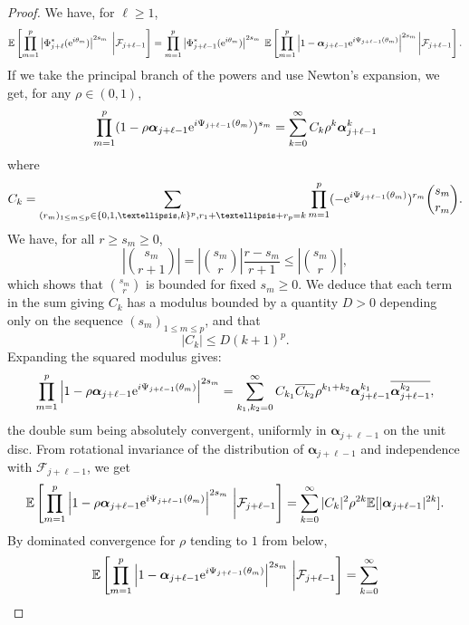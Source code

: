 \documentclass[10pt,a4paper]{amsart}
\begin{document}
\begin{proof}
We have, for 
$\ell \geq 1$, 
$$\mathbb{E} \left[ \prod_{m=1}^p \left|\Phi^*_{j+\ell} (\mathrm{e}^{\textnormal{i} \theta_m})
\right|^{2s_m} \;  \bigg| \mathcal{F}_{j+ \ell - 1} \right]
= \prod_{m=1}^p \left|\Phi^*_{j+\ell-1} (\mathrm{e}^{\textnormal{i} \theta_m})
\right|^{2s_m} \; 
\mathbb{E} \left[ \prod_{m=1}^p \left| 1 - \boldsymbol{\alpha}_{j+\ell-1} \mathrm{e}^{\textnormal{i} \Psi_{j+ \ell - 1} (\theta_m) }\right|^{2s_m} \bigg| \mathcal{F}_{j+ \ell-1} \right].
$$
If we take the principal branch of the powers
and use Newton's expansion, we get, for any $\rho \in (0,1)$,  
$$
\prod_{m=1}^p ( 1 - \rho \boldsymbol{\alpha}_{j+\ell-1} \mathrm{e}^{\textnormal{i} \Psi_{j+ \ell - 1} (\theta_m) })^{s_m} 
= \sum_{k=0}^{\infty} C_k \rho^k \boldsymbol{\alpha}^k_{j+\ell-1}
$$
where 
$$C_k = \sum_{(r_m)_{1 \leq m \leq p} \in
\{0,1,\dots, k\}^p, r_1 + \dots + r_p = k}
\prod_{m=1}^{p} (-\mathrm{e}^{\textnormal{i} \Psi_{j+ \ell - 1} (\theta_m) })^{r_m}
{s_m \choose r_m}.
$$
We have, for all $r \geq s_m \geq 0$, 
$$ \left|{s_m \choose {r+1}} \right|
=\left| {s_m \choose r} \right|\frac{r - s_m}{r+1} \leq \left| {s_m \choose r} \right|,$$
which shows that ${s_m \choose r} $ is bounded 
for fixed $s_m \geq 0$. 
We deduce that each term in the sum giving $C_k$ has a modulus bounded by a quantity $D > 0$ depending only on the sequence $(s_m)_{1 \leq m \leq p}$, and that 
$$|C_k| \leq D (k+1)^p. $$
Expanding the squared modulus gives: 
$$\prod_{m=1}^p \left| 1 - \rho \boldsymbol{\alpha}_{j+\ell-1} \mathrm{e}^{\textnormal{i} \Psi_{j+ \ell - 1} (\theta_m) }\right|^{2s_m} = 
\sum_{k_1, k_2 = 0}^{\infty}
C_{k_1} \overline{C_{k_2}} \rho^{k_1 + k_2}
\boldsymbol{\alpha}^{k_1}_{j+\ell-1} \overline{\boldsymbol{\alpha}_{j+\ell-1}^{k_2}},
$$
the double sum being absolutely convergent, uniformly in $\boldsymbol{\alpha}_{j+\ell-1}$ on the unit disc.  
From rotational invariance of the distribution of  $\boldsymbol{\alpha}_{j+\ell-1}$ and independence 
with $\mathcal{F}_{j+\ell-1}$, we get 
$$\mathbb{E} \left[ \prod_{m=1}^p \left| 1 - \rho \boldsymbol{\alpha}_{j+\ell-1} \mathrm{e}^{\textnormal{i} \Psi_{j+ \ell - 1} (\theta_m) }\right|^{2s_m} \, \bigg| \mathcal{F}_{j+ \ell-1} \right] 
= \sum_{k=0}^{\infty} 
|C_k|^2 \rho^{2k} \mathbb{E}[ |\boldsymbol{\alpha}_{j+\ell-1} |^{2k} ].$$
By dominated convergence for $\rho$ tending to $1$ from below, 
$$\mathbb{E} \left[ \prod_{m=1}^p \left| 1 -  \boldsymbol{\alpha}_{j+\ell-1} \mathrm{e}^{\textnormal{i} \Psi_{j+ \ell - 1} (\theta_m) }\right|^{2s_m} \, \bigg| \mathcal{F}_{j+ \ell-1} \right] 
= \sum_{k=0}^{\infty} 
$$
\end{proof}
\end{document}
